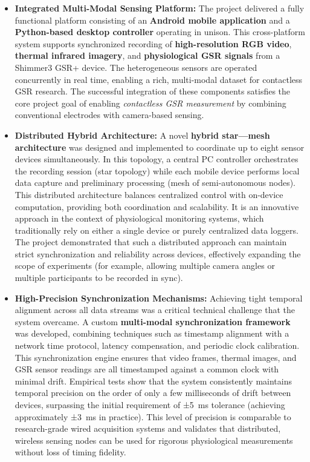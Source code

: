\begin{itemize}
\item \textbf{Integrated Multi-Modal Sensing Platform:} The project delivered a
  fully functional platform consisting of an \textbf{Android mobile
  application} and a \textbf{Python-based desktop controller} operating in
  unison. This cross-platform system supports synchronized recording of
  \textbf{high-resolution RGB video}, \textbf{thermal infrared imagery}, and
  \textbf{physiological GSR signals} from a Shimmer3 GSR+ device. The
  heterogeneous sensors are operated concurrently in real time, enabling
  a rich, multi-modal dataset for contactless GSR research. The
  successful integration of these components satisfies the core project
  goal of enabling \textit{contactless GSR measurement} by combining
  conventional electrodes with camera-based sensing.

\item \textbf{Distributed Hybrid Architecture:} A novel \textbf{hybrid star---mesh
  architecture} was designed and implemented to coordinate up to eight
  sensor devices simultaneously. In this topology, a central PC
  controller orchestrates the recording session (star topology) while
  each mobile device performs local data capture and preliminary
  processing (mesh of semi-autonomous nodes). This distributed
  architecture balances centralized control with on-device computation,
  providing both coordination and scalability. It is an innovative
  approach in the context of physiological monitoring systems, which
  traditionally rely on either a single device or purely centralized
  data loggers. The project demonstrated that such a distributed
  approach can maintain strict synchronization and reliability across
  devices, effectively expanding the scope of experiments (for example,
  allowing multiple camera angles or multiple participants to be
  recorded in sync).

\item \textbf{High-Precision Synchronization Mechanisms:} Achieving tight
  temporal alignment across all data streams was a critical technical
  challenge that the system overcame. A custom \textbf{multi-modal
  synchronization framework} was developed, combining techniques such
  as timestamp alignment with a network time protocol, latency
  compensation, and periodic clock calibration. This synchronization
  engine ensures that video frames, thermal images, and GSR sensor
  readings are all timestamped against a common clock with minimal
  drift. Empirical tests show that the system consistently maintains
  temporal precision on the order of only a few milliseconds of drift
  between devices, surpassing the initial requirement of ±5 ms tolerance
  (achieving approximately ±3 ms in
  practice\cite{Boucsein2012}).
  This level of precision is comparable to research-grade wired
  acquisition systems and validates that distributed, wireless sensing
  nodes can be used for rigorous physiological measurements without loss
  of timing fidelity.


\end{itemize}
